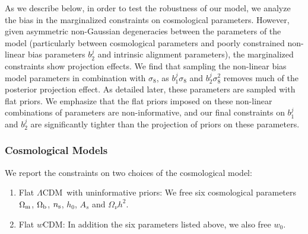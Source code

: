 \documentclass[aps, prd,twocolumn,superscriptaddress,nofootinbib,preprintnumbers]{revtex4-1}
\newcommand{\gammat}{\ensuremath{\gamma_{\rm t}(\theta)}}
\newcommand{\wtheta}{\ensuremath{w(\theta)}}
\newcommand{\lcdm}{$\Lambda$CDM}
\newcommand{\wcdm}{$w$CDM}
\newcommand{\red}[1]{\textcolor{red}{#1}}
\begin{document}
\begin{enumerate}
    As we describe below, in order to test the robustness of our model, we analyze the bias in the marginalized constraints on cosmological parameters. However, given asymmetric non-Gaussian degeneracies between the parameters of the model (particularly between cosmological parameters and poorly constrained non-linear bias parameters $b^{j}_2$ and intrinsic alignment parameters), the marginalized constraints show projection effects. We find that sampling the non-linear bias model parameters in combination with $\sigma_8$, as $b^{j}_1 \sigma_8$ and $b^{j}_2 \sigma^2_8$ removes much of the posterior projection effect. As detailed later, these parameters are sampled with flat priors. We emphasize that the flat priors imposed on these non-linear combinations of parameters are non-informative, and our final constraints on $b^{j}_1$ and $b^{j}_2$ are significantly tighter than the projection of priors on these parameters.
\end{enumerate}


\subsubsection{Cosmological Models}
\label{sec:cosmo_models}
We report the constraints on two choices of the cosmological model:
\begin{enumerate}
    \item Flat \lcdm\ with uninformative priors: We free six cosmological parameters $\Omega_{\rm m}$, $\Omega_{\rm b}$, $n_{\rm s}$, $h_0$, $A_s$ and $\Omega_\nu h^2$.
    \item Flat \wcdm : In addition the six parameters listed above, we also free $w_0$.
\end{enumerate}
\end{document}
